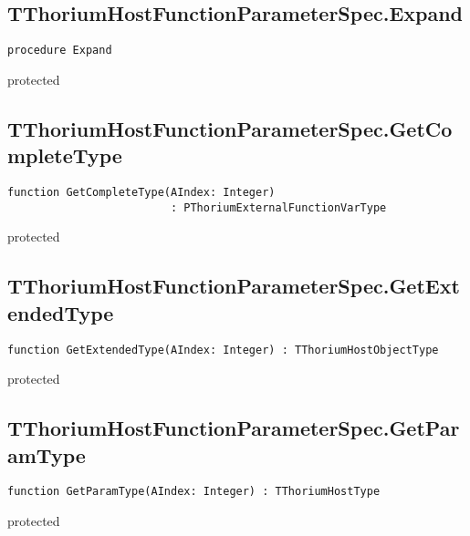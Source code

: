 \subsection{TThoriumHostFunctionParameterSpec.Expand}
\label{thoriumcore:thorium:tthoriumhostfunctionparameterspec:expand}
\begin{FPCList}
\Synopsis
\Declaration 

\begin{verbatim}
procedure Expand
\end{verbatim}
\Visibility
protected
\Description
\Errors
\end{FPCList}
\subsection{TThoriumHostFunctionParameterSpec.GetCompleteType}
\label{thoriumcore:thorium:tthoriumhostfunctionparameterspec:getcompletetype}
\begin{FPCList}
\Synopsis
\Declaration 

\begin{verbatim}
function GetCompleteType(AIndex: Integer)
                         : PThoriumExternalFunctionVarType
\end{verbatim}
\Visibility
protected
\Description
\Errors
\end{FPCList}
\subsection{TThoriumHostFunctionParameterSpec.GetExtendedType}
\label{thoriumcore:thorium:tthoriumhostfunctionparameterspec:getextendedtype}
\begin{FPCList}
\Synopsis
\Declaration 

\begin{verbatim}
function GetExtendedType(AIndex: Integer) : TThoriumHostObjectType
\end{verbatim}
\Visibility
protected
\Description
\Errors
\end{FPCList}
\subsection{TThoriumHostFunctionParameterSpec.GetParamType}
\label{thoriumcore:thorium:tthoriumhostfunctionparameterspec:getparamtype}
\begin{FPCList}
\Synopsis
\Declaration 

\begin{verbatim}
function GetParamType(AIndex: Integer) : TThoriumHostType
\end{verbatim}
\Visibility
protected
\Description
\Errors
\end{FPCList}
